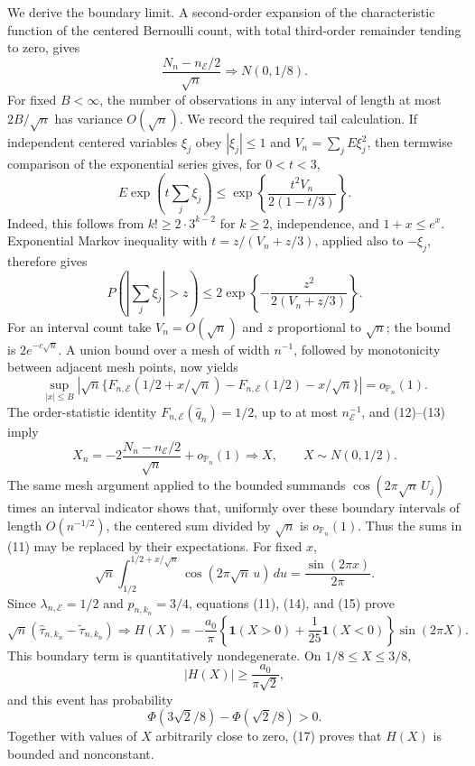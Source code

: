 We derive the boundary limit.  A second-order expansion of the characteristic function of the centered Bernoulli count, with total third-order remainder tending to zero, gives
\[
 \frac{N_n-n_{\mathcal E}/2}{\sqrt n}\Rightarrow N(0,1/8).
\tag{12}
\]
For fixed \(B<\infty\), the number of observations in any interval of length at most \(2B/\sqrt n\) has variance \(O(\sqrt n)\).  We record the required tail calculation.  If independent centered variables \(\xi_j\) obey \(|\xi_j|\leq1\) and \(V_n=\sum_jE\xi_j^2\), then termwise comparison of the exponential series gives, for \(0<t<3\),
\[
 E\exp\!\left(t\sum_j\xi_j\right)
 \leq\exp\!\left\{\frac{t^2V_n}{2(1-t/3)}\right\}.
\]
Indeed, this follows from \(k!\geq2\cdot3^{k-2}\) for \(k\geq2\), independence, and \(1+x\leq e^x\).  Exponential Markov inequality with \(t=z/(V_n+z/3)\), applied also to \(-\xi_j\), therefore gives
\[
 P\!\left(\left|\sum_j\xi_j\right|>z\right)
 \leq2\exp\!\left\{-\frac{z^2}{2(V_n+z/3)}\right\}.
\]
For an interval count take \(V_n=O(\sqrt n)\) and \(z\) proportional to \(\sqrt n\); the bound is \(2e^{-c\sqrt n}\).  A union bound over a mesh of width \(n^{-1}\), followed by monotonicity between adjacent mesh points, now yields
\[
 \sup_{|x|\leq B}\left|
 \sqrt n\{F_{n,\mathcal E}(1/2+x/\sqrt n)
 -F_{n,\mathcal E}(1/2)-x/\sqrt n\}
 \right|=o_{\mathbb P_n}(1).
\tag{13}
\]
The order-statistic identity \(F_{n,\mathcal E}(\widehat q_n)=1/2\), up to at most \(n_{\mathcal E}^{-1}\), and (12)--(13) imply
\[
 X_n=-2\frac{N_n-n_{\mathcal E}/2}{\sqrt n}+o_{\mathbb P_n}(1)
 \Rightarrow X,
 \qquad X\sim N(0,1/2).
\tag{14}
\]
The same mesh argument applied to the bounded summands \(\cos(2\pi\sqrt n\,U_j)\) times an interval indicator shows that, uniformly over these boundary intervals of length \(O(n^{-1/2})\), the centered sum divided by \(\sqrt n\) is \(o_{\mathbb P_n}(1)\).  Thus the sums in (11) may be replaced by their expectations.  For fixed \(x\),
\[
 \sqrt n\int_{1/2}^{1/2+x/\sqrt n}
 \cos(2\pi\sqrt n\,u)\,du
 =\frac{\sin(2\pi x)}{2\pi}.
\tag{15}
\]
Since \(\lambda_{n,\mathcal E}=1/2\) and \(p_{n,k_n}=3/4\), equations (11), (14), and (15) prove
\[
 \sqrt n(\widehat\tau_{n,k_n}-\widetilde\tau_{n,k_n})
 \Rightarrow
 H(X)=-\frac{a_0}{\pi}
 \left\{\mathbf1(X>0)+\frac1{25}\mathbf1(X<0)\right\}
 \sin(2\pi X).
\tag{16}
\]
This boundary term is quantitatively nondegenerate.  On \(1/8\leq X\leq3/8\),
\[
 |H(X)|\geq\frac{a_0}{\pi\sqrt2},
\]
and this event has probability
\[
 \Phi(3\sqrt2/8)-\Phi(\sqrt2/8)>0.
\tag{17}
\]
Together with values of \(X\) arbitrarily close to zero, (17) proves that \(H(X)\) is bounded and nonconstant.

